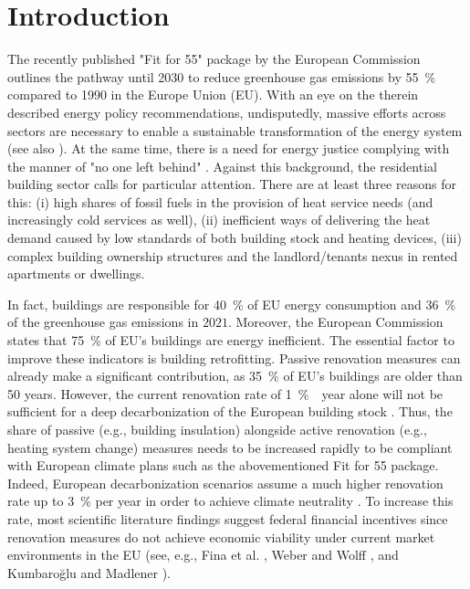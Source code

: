 \section{Introduction}
The recently published "Fit for 55" package \cite{european_commission_european_2019} by the European Commission outlines the pathway until 2030 to reduce greenhouse gas emissions by \SI{55}{\%} compared to 1990 in the Europe Union (EU). With an eye on the therein described energy policy recommendations, undisputedly, massive efforts across sectors are necessary to enable a sustainable transformation of the energy system (see also \cite{korkmaz2020comparison}). At the same time, there is a need for energy justice complying with the manner of "no one left behind" \cite{sovacool2019decarbonization}. Against this background, the residential building sector calls for particular attention. There are at least three reasons for this: (i) high shares of fossil fuels in the provision of heat service needs (and increasingly cold services as well), (ii) inefficient ways of delivering the heat demand caused by low standards of both building stock and heating devices, (iii) complex building ownership structures and the landlord/tenants nexus in rented apartments or dwellings.\vspace{0.5cm}

In fact, buildings are responsible for \SI{40}{\%} of EU energy consumption and \SI{36}{\%} of the greenhouse gas emissions in $2021$. Moreover, the European Commission states that \SI{75}{\%} of EU's buildings are energy inefficient. The essential factor to improve these indicators is building retrofitting. Passive renovation measures can already make a significant contribution, as \SI{35}{\%} of EU's buildings are older than \SI{50}{} years. However, the current renovation rate of \SI{1}{\% \per year} alone will not be sufficient for a deep decarbonization of the European building stock \cite{eurocombuildings2021}. Thus, the share of passive (e.g., building insulation) alongside active renovation (e.g., heating system change) measures needs to be increased rapidly to be compliant with European climate plans such as the abovementioned Fit for 55 package. Indeed, European decarbonization scenarios assume a much higher renovation rate up to \SI{3}{\%} per year in order to achieve climate neutrality \cite{korkmaz2020comparison}. To increase this rate, most scientific literature findings suggest federal financial incentives since renovation measures do not achieve economic viability under current market environments in the EU (see, e.g., Fina et al. \cite{fina2019profitability}, Weber and Wolff \cite{weber2018energy}, and Kumbaroğlu and Madlener \cite{kumbarouglu2012evaluation}).\vspace{0.5cm}

